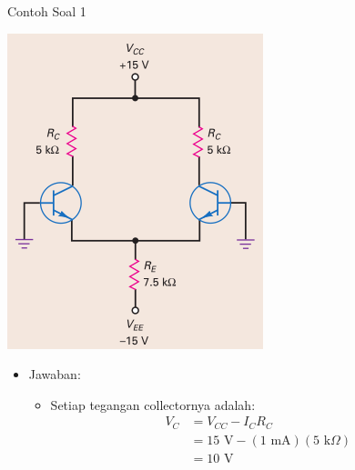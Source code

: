 \documentclass[aspectratio=169]{beamer}
\begin{document}
\begin{frame}{Contoh Soal 1}
	\begin{multicols}{2}
		\begin{center}
			\includegraphics[width=0.6\textheight]{gambar/01.latihan_soal_1a}
		\end{center}
		\columnbreak
		\begin{itemize}
			\item Jawaban:
			\begin{itemize}
				\item Setiap tegangan collectornya adalah:
				\begin{align*}
					V_C &= V_{CC} - I_C R_C \\
					&= 15 \text{ V} - (1 \text{ mA})(5 \text{ k}\Omega) \\
					&= 10 \text{ V}
				\end{align*}
				\[  \]
			\end{itemize}
		\end{itemize}
		\vfill\null
	\end{multicols}
\end{frame}
\end{document}

